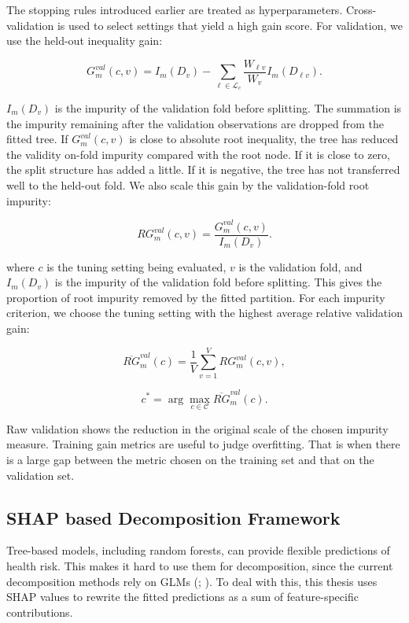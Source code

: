 \documentclass[
  11pt,
  a4paper,
]{article}
\begin{document}
The stopping rules introduced earlier are treated as hyperparameters.
Cross-validation is used to select settings that yield a high gain
score. For validation, we use the held-out inequality gain:

\[
G_m^{val}(c,v)
=
I_m(D_v)
-
\sum_{\ell \in \mathcal{L}_c}
\frac{W_{\ell v}}{W_v} I_m(D_{\ell v}).
\]

\(I_m(D_v)\) is the impurity of the validation fold before splitting.
The summation is the impurity remaining after the validation
observations are dropped from the fitted tree. If \(G_m^{val}(c,v)\) is
close to absolute root inequality, the tree has reduced the validity
on-fold impurity compared with the root node. If it is close to zero,
the split structure has added a little. If it is negative, the tree has
not transferred well to the held-out fold. We also scale this gain by
the validation-fold root impurity:

\[
RG_m^{val}(c,v)
=
\frac{G_m^{val}(c,v)}{I_m(D_v)}.
\]

where \(c\) is the tuning setting being evaluated, \(v\) is the
validation fold, and \(I_m(D_v)\) is the impurity of the validation fold
before splitting. This gives the proportion of root impurity removed by
the fitted partition. For each impurity criterion, we choose the tuning
setting with the highest average relative validation gain:

\[
\overline{RG}_m^{val}(c)
=
\frac{1}{V}
\sum_{v=1}^{V} RG_m^{val}(c,v),
\]

\[
c^*
=
\arg\max_{c \in \mathcal{C}}
\overline{RG}_m^{val}(c).
\]

Raw validation shows the reduction in the original scale of the chosen
impurity measure. Training gain metrics are useful to judge overfitting.
That is when there is a large gap between the metric chosen on the
training set and that on the validation set.

\subsection{SHAP based Decomposition
Framework}\label{sec-tree-based-decomposition}

Tree-based models, including random forests, can provide flexible
predictions of health risk. This makes it hard to use them for
decomposition, since the current decomposition methods rely on GLMs
(; ). To deal with this, this thesis uses SHAP values
to rewrite the fitted predictions as a sum of feature-specific
contributions.
\end{document}
